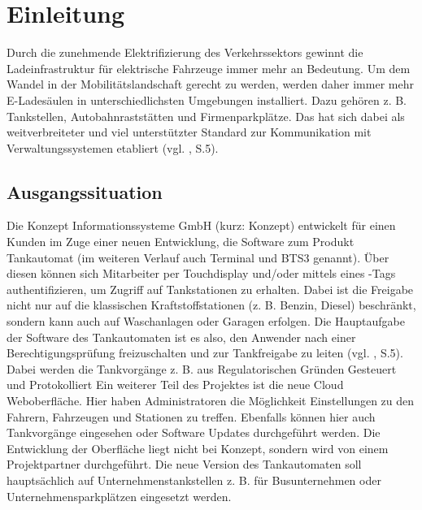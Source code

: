 \section{Einleitung}
Durch die zunehmende Elektrifizierung des Verkehrssektors gewinnt die Ladeinfrastruktur für elektrische Fahrzeuge immer mehr an Bedeutung. Um dem Wandel in der Mobilitätslandschaft gerecht zu werden, werden daher immer mehr E-Ladesäulen in unterschiedlichsten Umgebungen installiert. Dazu gehören z. B. Tankstellen, Autobahnraststätten und Firmenparkplätze. Das  hat sich dabei als weitverbreiteter und viel unterstützter Standard zur Kommunikation mit Verwaltungssystemen etabliert (vgl. \cite{OCPP-Chronicles_popularity}, S.5).
\subsection{Ausgangssituation}
Die Konzept Informationssysteme GmbH (kurz: Konzept) entwickelt für einen Kunden im Zuge einer neuen Entwicklung, die Software zum Produkt Tankautomat (im weiteren Verlauf auch Terminal und \ac{BTS3} genannt). Über diesen können sich Mitarbeiter per Touchdisplay und/oder mittels eines -Tags authentifizieren, um Zugriff auf Tankstationen zu erhalten. Dabei ist die Freigabe nicht nur auf die klassischen Kraftstoffstationen (z. B. Benzin, Diesel) beschränkt, sondern kann auch auf Waschanlagen oder Garagen erfolgen. Die Hauptaufgabe der Software des Tankautomaten ist es also, den Anwender nach einer Berechtigungsprüfung freizuschalten und zur Tankfreigabe zu leiten (vgl. \cite{Lastenheft_Software}, S.5). Dabei werden die Tankvorgänge z. B. aus Regulatorischen Gründen Gesteuert und Protokolliert \newline
\noindent Ein weiterer Teil des Projektes ist die neue Cloud Weboberfläche. Hier haben Administratoren die Möglichkeit Einstellungen zu den Fahrern, Fahrzeugen und Stationen zu treffen. Ebenfalls können hier auch Tankvorgänge eingesehen oder Software Updates durchgeführt werden. Die Entwicklung der Oberfläche liegt nicht bei Konzept, sondern wird von einem Projektpartner durchgeführt.\newline
\noindent Die neue Version des Tankautomaten soll hauptsächlich auf Unternehmenstankstellen z. B. für Busunternehmen oder Unternehmensparkplätzen eingesetzt werden.
